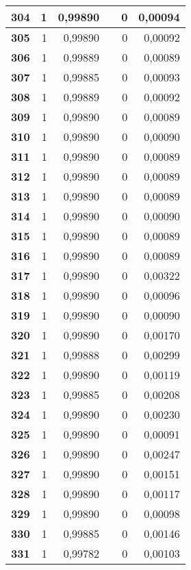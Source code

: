{\begin{longtable}{|r|r|r|l|r|r|}
\textbf{304} & 1 & 0,99890 &  & 0 & 0,00094 \\ \hline
\textbf{305} & 1 & 0,99890 &  & 0 & 0,00092 \\ \hline
\textbf{306} & 1 & 0,99889 &  & 0 & 0,00089 \\ \hline
\textbf{307} & 1 & 0,99885 &  & 0 & 0,00093 \\ \hline
\textbf{308} & 1 & 0,99889 &  & 0 & 0,00092 \\ \hline
\textbf{309} & 1 & 0,99890 &  & 0 & 0,00089 \\ \hline
\textbf{310} & 1 & 0,99890 &  & 0 & 0,00090 \\ \hline
\textbf{311} & 1 & 0,99890 &  & 0 & 0,00089 \\ \hline
\textbf{312} & 1 & 0,99890 &  & 0 & 0,00089 \\ \hline
\textbf{313} & 1 & 0,99890 &  & 0 & 0,00089 \\ \hline
\textbf{314} & 1 & 0,99890 &  & 0 & 0,00090 \\ \hline
\textbf{315} & 1 & 0,99890 &  & 0 & 0,00089 \\ \hline
\textbf{316} & 1 & 0,99890 &  & 0 & 0,00089 \\ \hline
\textbf{317} & 1 & 0,99890 &  & 0 & 0,00322 \\ \hline
\textbf{318} & 1 & 0,99890 &  & 0 & 0,00096 \\ \hline
\textbf{319} & 1 & 0,99890 &  & 0 & 0,00090 \\ \hline
\textbf{320} & 1 & 0,99890 &  & 0 & 0,00170 \\ \hline
\textbf{321} & 1 & 0,99888 &  & 0 & 0,00299 \\ \hline
\textbf{322} & 1 & 0,99890 &  & 0 & 0,00119 \\ \hline
\textbf{323} & 1 & 0,99885 &  & 0 & 0,00208 \\ \hline
\textbf{324} & 1 & 0,99890 &  & 0 & 0,00230 \\ \hline
\textbf{325} & 1 & 0,99890 &  & 0 & 0,00091 \\ \hline
\textbf{326} & 1 & 0,99890 &  & 0 & 0,00247 \\ \hline
\textbf{327} & 1 & 0,99890 &  & 0 & 0,00151 \\ \hline
\textbf{328} & 1 & 0,99890 &  & 0 & 0,00117 \\ \hline
\textbf{329} & 1 & 0,99890 &  & 0 & 0,00098 \\ \hline
\textbf{330} & 1 & 0,99885 &  & 0 & 0,00146 \\ \hline
\textbf{331} & 1 & 0,99782 &  & 0 & 0,00103 \\ \hline

\end{longtable}}

